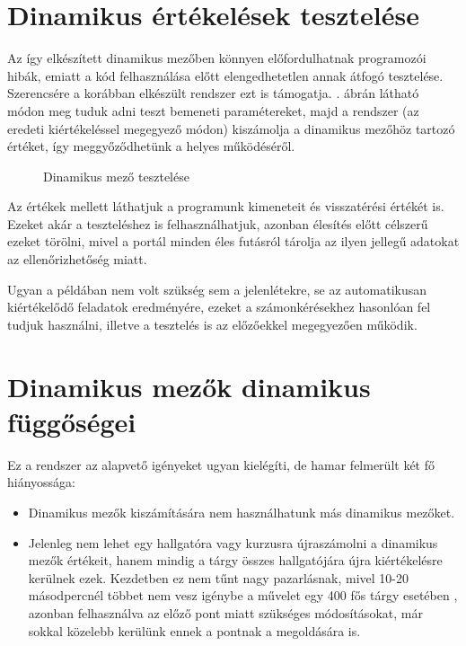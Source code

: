 \section{Dinamikus értékelések tesztelése}
Az így elkészített dinamikus mezőben könnyen előfordulhatnak programozói hibák, emiatt a kód felhasználása előtt elengedhetetlen annak átfogó tesztelése. Szerencsére a korábban elkészült rendszer ezt is támogatja. . ábrán látható módon meg tuduk adni teszt bemeneti paramétereket, majd a rendszer (az eredeti kiértékeléssel megegyező módon) kiszámolja a dinamikus mezőhöz tartozó értéket, így meggyőződhetünk a helyes működéséről.

\begin{figure}[h]
    \centering
    \caption{Dinamikus mező tesztelése}
    \label{fig:jporta_dynamic_test}
\end{figure}

Az értékek mellett láthatjuk a programunk kimeneteit és visszatérési értékét is. Ezeket akár a teszteléshez is felhasználhatjuk, azonban élesítés előtt célszerű ezeket törölni, mivel a portál minden éles futásról tárolja az ilyen jellegű adatokat az ellenőrizhetőség miatt.

Ugyan a példában nem volt szükség sem a jelenlétekre, se az automatikusan kiértékelődő feladatok eredményére, ezeket a számonkérésekhez hasonlóan fel tudjuk használni, illetve a tesztelés is az előzőekkel megegyezően működik.

\section{Dinamikus mezők dinamikus függőségei}\label{section:dynamic_dependencies}
Ez a rendszer az alapvető igényeket ugyan kielégíti, de hamar felmerült két fő hiányossága:

\begin{itemize}
    \item Dinamikus mezők kiszámítására nem használhatunk más dinamikus mezőket. 
    \item Jelenleg nem lehet egy hallgatóra vagy kurzusra újraszámolni a dinamikus mezők értékeit, hanem mindig a tárgy összes hallgatójára újra kiértékelésre kerülnek ezek. Kezdetben ez nem tűnt nagy pazarlásnak, mivel 10-20 másodpercnél többet nem vesz igénybe a művelet egy 400 fős tárgy esetében \cite{KalmanMsc}, azonban felhasználva az előző pont miatt szükséges módosításokat, már sokkal közelebb kerülünk ennek a pontnak a megoldására is.
\end{itemize}

